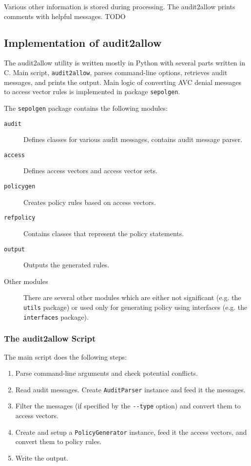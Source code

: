 Various other information is stored during processing. The audit2allow prints
comments with helpful messages. TODO

\subsection{Implementation of audit2allow}
The audit2allow utility is written mostly in Python with several parts written
in C.  Main script, \texttt{audit2allow}, parses command-line options, retrieves
audit messages, and prints the output.  Main logic of converting AVC denial
messages to access vector rules is implemented in package \texttt{sepolgen}.

The \texttt{sepolgen} package contains the following modules:
\begin{description}
    \item [\texttt{audit}] Defines classes for various audit messages, contains
        audit message parser.
    \item [\texttt{access}] Defines access vectors and access vector sets.
    \item [\texttt{policygen}] Creates policy rules based on access vectors.
    \item [\texttt{refpolicy}] Contains classes that represent the policy
        statements.
    \item [\texttt{output}] Outputs the generated rules.
    \item [Other modules] There are several other modules which are either not
        significant (e.g. the \texttt{utils} package) or used only for
        generating policy using interfaces (e.g. the \texttt{interfaces}
        package).
\end{description}

\subsubsection{The audit2allow Script}

The main script does the following steps:
\begin{enumerate}
    \item Parse command-line arguments and check potential conflicts.
    \item Read audit messages. Create \texttt{AuditParser} instance and feed it
        the messages.
    \item Filter the messages (if specified by the \texttt{-{}-type} option) and
        convert them to access vectors.
    \item Create and setup a \texttt{PolicyGenerator} instance, feed it the
        access vectors, and convert them to policy rules.
    \item Write the output.
\end{enumerate}


